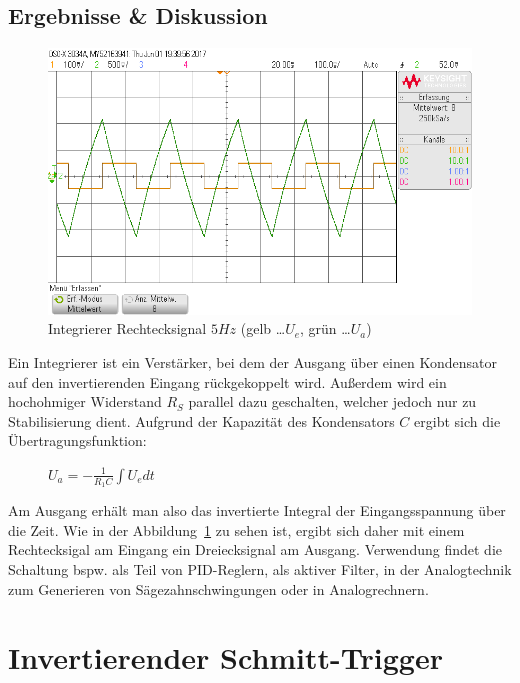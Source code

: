 \documentclass[12pt,a4paper,titlepage]{article}
\begin{document}
\subsection*{Ergebnisse \& Diskussion}
\begin{figure}[H]
  \centering
  \includegraphics[width=150mm]{integrierer_rechtecksignal_eingang_ausgang.png}
  \caption{Integrierer Rechtecksignal $5Hz$ (gelb \dots $U_e$, gr\"un \dots $U_a$)}
  \label{figure32}
\end{figure}
Ein Integrierer ist ein Verst\"arker, bei dem der Ausgang \"uber einen Kondensator auf den invertierenden Eingang r\"uckgekoppelt wird. Au\ss erdem wird ein hochohmiger Widerstand $R_S$ parallel dazu geschalten, welcher jedoch nur zu Stabilisierung dient. Aufgrund der Kapazit\"at des Kondensators $C$ ergibt sich die \"Ubertragungsfunktion:
\begin{figure}[H]
\centering
$U_a = - \frac{1}{R_1C} \int U_e dt$
\end{figure}
\noindent Am Ausgang erh\"alt man also das invertierte Integral der Eingangsspannung \"uber die Zeit. Wie in der Abbildung~\ref{figure32} zu sehen ist, ergibt sich daher mit einem Rechtecksigal am Eingang ein Dreiecksignal am Ausgang. Verwendung findet die Schaltung bspw. als Teil von PID-Reglern, als aktiver Filter, in der Analogtechnik zum Generieren von S\"agezahnschwingungen oder in Analogrechnern.



\section{Invertierender Schmitt-Trigger}

\end{document}
